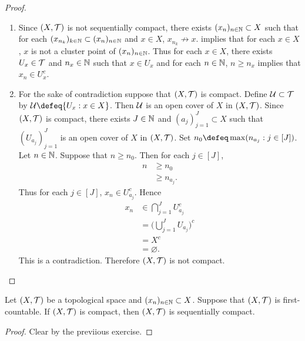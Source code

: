 \documentclass{book}
\begin{document}
\begin{proof}\
	\begin{enumerate}
		\item Since $(X, \mathcal{T})$ is not sequentially compact, there exists $(x_n)_{n \in \mathbb{N}} \subset X$ such that for each $(x_{n_k})_{k \in \mathbb{N}} \subset (x_n)_{n \in \mathbb{N}}$ and $x \in X$, $x_{n_k} \not \rightarrow x$.  implies that for each $x \in X$, $x$ is not a cluster point of $(x_n)_{n \in \mathbb{N}}$. Thus for each $x \in X$, there exists $U_x \in \mathcal{T}$ and $n_x \in \mathbb{N}$ such that $x \in U_x$ and for each $n \in \mathbb{N}$, $n \geq n_x$ implies that $x_n \in U_x^c$. 
		\item For the sake of contradiction suppose that $(X, \mathcal{T})$ is compact. Define $\mathcal{U} \subset \mathcal{T}$ by $\MU \defeq \{ U_x: x \in X\}$. Then $\mathcal{U}$ is an open cover of $X$ in $(X, \mathcal{T})$. Since $(X, \mathcal{T})$ is compact, there exists $J \in \mathbb{N}$ and $(a_j)_{j = 1}^J \subset X$ such that $(U_{a_j})_{j=1}^J$ is an open cover of $X$ in $(X, \mathcal{T})$. Set $n_0 \defeq \max(n_{a_j}: j \in [J])$. Let $n \in \mathbb{N}$. Suppose that $n \geq n_0$. Then for each $j \in [J]$, 
		\begin{align*}
			n 
			& \geq n_0 \\
			& \geq n_{a_j}.
		\end{align*}
		Thus for each $j \in [J]$, $x_n \in U_{a_j}^c$. Hence 
		\begin{align*}
			x_n 
			& \in \bigcap\limits_{j=1}^J U_{a_j}^c \\
			& = \bigg( \bigcup\limits_{j=1}^J U_{a_j} \bigg)^c \\
			& = X^c \\
			& = \varnothing.
		\end{align*}
		This is a contradiction. Therefore $(X, \mathcal{T})$ is not compact.
	\end{enumerate}
\end{proof}
 
 \begin{ex} 
 	Let $(X, \mathcal{T})$ be a topological space and $(x_n)_{n \in \mathbb{N}} \subset X$. Suppose that $(X, \mathcal{T})$ is first-countable. If $(X, \mathcal{T})$ is compact, then $(X, \mathcal{T})$ is sequentially compact.
 \end{ex}

\begin{proof}
	Clear by the previious exercise. 
\end{proof}
 
 
 
 
 
\end{document}
